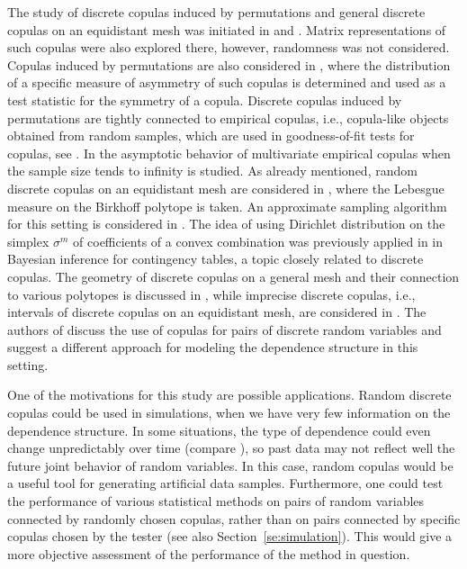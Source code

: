 \documentclass[12pt,a4paper]{amsart}
\theoremstyle{definition}
\begin{document}
The study of discrete copulas induced by permutations and general discrete copulas on an equidistant mesh was initiated in \cite{MaySunTor05} and \cite{KolMesMordSem06}. Matrix representations of such copulas were also explored there, however, randomness was not considered.
Copulas induced by permutations are also considered in \cite{ErGoNe08}, where the distribution of a specific measure of asymmetry of such copulas is determined and used as a test statistic for the symmetry of a copula.
Discrete copulas induced by permutations are tightly connected to empirical copulas, i.e., copula-like objects obtained from random samples, which are used in goodness-of-fit tests for copulas, see \cite{GeReBe09}.
In \cite{GenNesRem14} the asymptotic behavior of multivariate empirical copulas when the sample size tends to infinity is studied.  As already mentioned, random discrete copulas on an equidistant mesh are considered in \cite{ChaDiaSly10}, where the Lebesgue measure on the Birkhoff polytope is taken.
An approximate sampling algorithm for this setting is considered in \cite{CapSomBruZyc09}. The idea of using Dirichlet distribution on the simplex $\sigma^m$ of coefficients of a convex combination was previously applied in \cite{MelPet95} in Bayesian inference for contingency tables, a topic closely related to discrete copulas. 
The geometry of discrete copulas on a general mesh and their connection to various polytopes is discussed in \cite{PeSoUh19}, while imprecise discrete copulas, i.e., intervals of discrete copulas on an equidistant mesh, are considered in \cite{KoPe25}.
The authors of \cite{Gee20,KoMa24} discuss the use of copulas for pairs of discrete random variables and suggest a different approach for modeling the dependence structure in this setting.

One of the motivations for this study are possible applications. Random discrete copulas could be used in simulations, when we have very few information on the dependence structure. 
In some situations, the type of dependence could even change unpredictably over time (compare \cite{FeWe12,YaCaHaLi22}), so past data may not reflect well the future joint behavior of random variables.
In this case, random copulas would be a useful tool for generating artificial data samples.
Furthermore, one could test the performance of various statistical methods on pairs of random variables connected by randomly chosen copulas, rather than on pairs connected by specific copulas chosen by the tester (see also Section~\ref{se:simulation}). 
This would give a more objective assessment of the performance of the method in question. 
\end{document}
